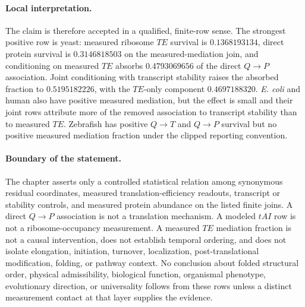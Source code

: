 \paragraph{Local interpretation.}
The claim is therefore accepted in a qualified, finite-row sense.  The strongest positive row is yeast: measured ribosome $TE$ survival is $0.1368193134$, direct protein survival is $0.3146818503$ on the measured-mediation join, and conditioning on measured $TE$ absorbs $0.4793069656$ of the direct $Q\to P$ association.  Joint conditioning with transcript stability raises the absorbed fraction to $0.5195182226$, with the $TE$-only component $0.4697188320$.  \textit{E. coli} and human also have positive measured mediation, but the effect is small and their joint rows attribute more of the removed association to transcript stability than to measured $TE$.  Zebrafish has positive $Q\to T$ and $Q\to P$ survival but no positive measured mediation fraction under the clipped reporting convention.

\paragraph{Boundary of the statement.}
The chapter asserts only a controlled statistical relation among synonymous residual coordinates, measured translation-efficiency readouts, transcript or stability controls, and measured protein abundance on the listed finite joins.  A direct $Q\to P$ association is not a translation mechanism.  A modeled $tAI$ row is not a ribosome-occupancy measurement.  A measured $TE$ mediation fraction is not a causal intervention, does not establish temporal ordering, and does not isolate elongation, initiation, turnover, localization, post-translational modification, folding, or pathway context.  No conclusion about folded structural order, physical admissibility, biological function, organismal phenotype, evolutionary direction, or universality follows from these rows unless a distinct measurement contact at that layer supplies the evidence.
